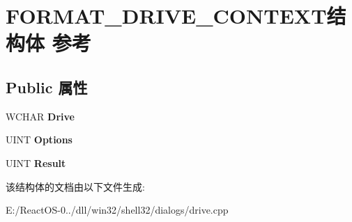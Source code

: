\hypertarget{struct_f_o_r_m_a_t___d_r_i_v_e___c_o_n_t_e_x_t}{}\section{F\+O\+R\+M\+A\+T\+\_\+\+D\+R\+I\+V\+E\+\_\+\+C\+O\+N\+T\+E\+X\+T结构体 参考}
\label{struct_f_o_r_m_a_t___d_r_i_v_e___c_o_n_t_e_x_t}
\subsection*{Public 属性}
\begin{DoxyCompactItemize}
\item 
\mbox{\label{struct_f_o_r_m_a_t___d_r_i_v_e___c_o_n_t_e_x_t_abd04fa6152c0d63d37bd19020b6272d5}} 
W\+C\+H\+AR {\bfseries Drive}
\item 
\mbox{\label{struct_f_o_r_m_a_t___d_r_i_v_e___c_o_n_t_e_x_t_ad2c55db00358c215037e2ecff404ca95}} 
U\+I\+NT {\bfseries Options}
\item 
\mbox{\label{struct_f_o_r_m_a_t___d_r_i_v_e___c_o_n_t_e_x_t_af7878ace496e7f43e6507823444d8619}} 
U\+I\+NT {\bfseries Result}
\end{DoxyCompactItemize}


该结构体的文档由以下文件生成\+:\begin{DoxyCompactItemize}
\item 
E\+:/\+React\+O\+S-\/0../dll/win32/shell32/dialogs/drive.\+cpp\end{DoxyCompactItemize}
